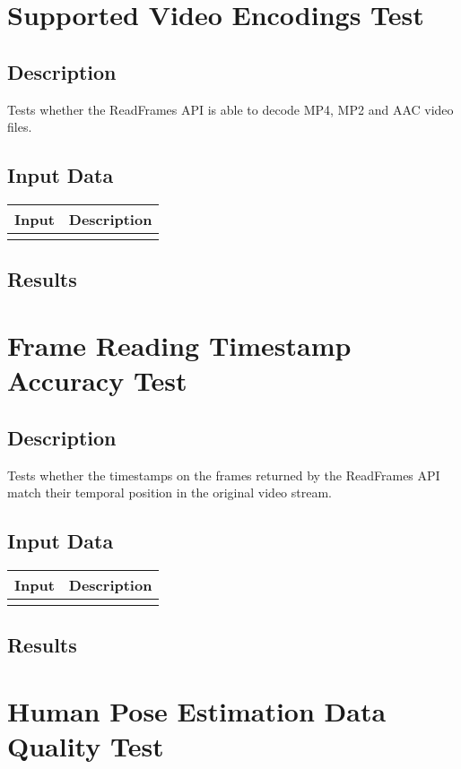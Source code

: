 \documentclass{scrreprt}
\begin{document}
\section{Supported Video Encodings Test}
\subsection{Description}
Tests whether the ReadFrames API is able to decode MP4, MP2 and AAC video files.
\subsection{Input Data}
 \centering
 \begin{tabular}{p{3cm}p{6cm}}
 \hline\hline
 Input & Description\\
 \hline\hline
   &  \\ %
 \hline
 \end{tabular}
\subsection{Results}

\section{Frame Reading Timestamp Accuracy Test}
\subsection{Description}
Tests whether the timestamps on the frames returned by the ReadFrames API match their temporal position in the original video stream.
\subsection{Input Data}
 \centering
 \begin{tabular}{p{3cm}p{6cm}}
 \hline\hline
 Input & Description\\
 \hline\hline
   &  \\ %
 \hline
 \end{tabular}
\subsection{Results}

\section{Human Pose Estimation Data Quality Test}
\end{document}
